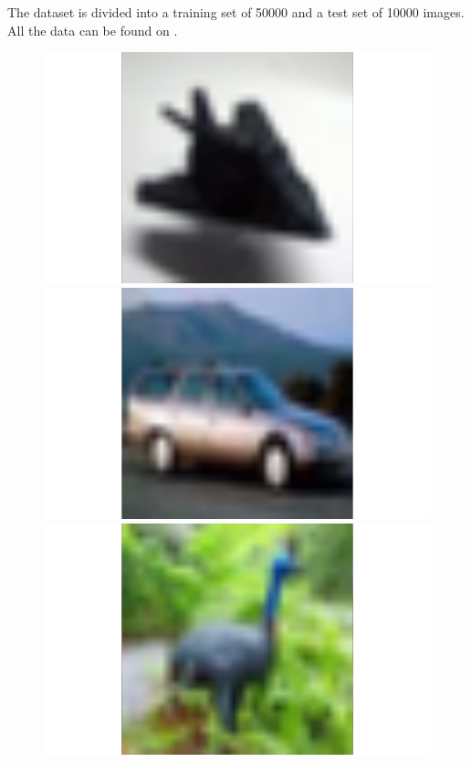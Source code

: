The dataset is divided into a training set of 50000 and a test set of 10000 images.\\
All the data can be found on \cite{cifar10}.

\begin{figure}
 \begin{minipage}{0.19\textwidth}
  \includegraphics[width=1.5\textwidth]{../plots/cifar10-class0}
 \end{minipage}
 \begin{minipage}{0.19\textwidth}
  \includegraphics[width=1.5\textwidth]{../plots/cifar10-class1}
 \end{minipage}
 \begin{minipage}{0.19\textwidth}
  \includegraphics[width=1.5\textwidth]{../plots/cifar10-class2}

\end{minipage}
\end{figure}
